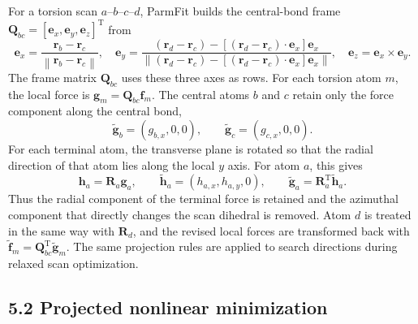 For a torsion scan $a$--$b$--$c$--$d$, ParmFit builds the central-bond frame $\mathbf{Q}_{bc}=[\mathbf{e}_x,\mathbf{e}_y,\mathbf{e}_z]^{\mathrm{T}}$ from
\begin{equation}
\mathbf{e}_x =
\frac{\mathbf{r}_b-\mathbf{r}_c}
{\left\|\mathbf{r}_b-\mathbf{r}_c\right\|},
\quad
\mathbf{e}_y =
\frac{
(\mathbf{r}_d-\mathbf{r}_c)
-
\left[(\mathbf{r}_d-\mathbf{r}_c)\cdot\mathbf{e}_x\right]\mathbf{e}_x
}{
\left\|
(\mathbf{r}_d-\mathbf{r}_c)
-
\left[(\mathbf{r}_d-\mathbf{r}_c)\cdot\mathbf{e}_x\right]\mathbf{e}_x
\right\|
},
\quad
\mathbf{e}_z=\mathbf{e}_x\times\mathbf{e}_y .
\end{equation}
The frame matrix $\mathbf{Q}_{bc}$ uses these three axes as rows.
For each torsion atom $m$, the local force is $\mathbf{g}_m=\mathbf{Q}_{bc}\mathbf{f}_m$. The central atoms $b$ and $c$ retain only the force component along the central bond,
\begin{equation}
\widetilde{\mathbf{g}}_b
=
\left(g_{b,x},0,0\right),
\qquad
\widetilde{\mathbf{g}}_c
=
\left(g_{c,x},0,0\right).
\end{equation}
For each terminal atom, the transverse plane is rotated so that the radial direction of that atom lies along the local $y$ axis. For atom $a$, this gives
\begin{equation}
\mathbf{h}_a=\mathbf{R}_a\mathbf{g}_a,
\qquad
\widetilde{\mathbf{h}}_a=
\left(h_{a,x},h_{a,y},0\right),
\qquad
\widetilde{\mathbf{g}}_a=
\mathbf{R}_a^{\mathrm{T}}\widetilde{\mathbf{h}}_a .
\end{equation}
Thus the radial component of the terminal force is retained and the azimuthal component that directly changes the scan dihedral is removed. Atom $d$ is treated in the same way with $\mathbf{R}_d$, and the revised local forces are transformed back with $\widetilde{\mathbf{f}}_m=\mathbf{Q}_{bc}^{\mathrm{T}}\widetilde{\mathbf{g}}_m$. The same projection rules are applied to search directions during relaxed scan optimization.

\subsection{5.2 Projected nonlinear minimization}


